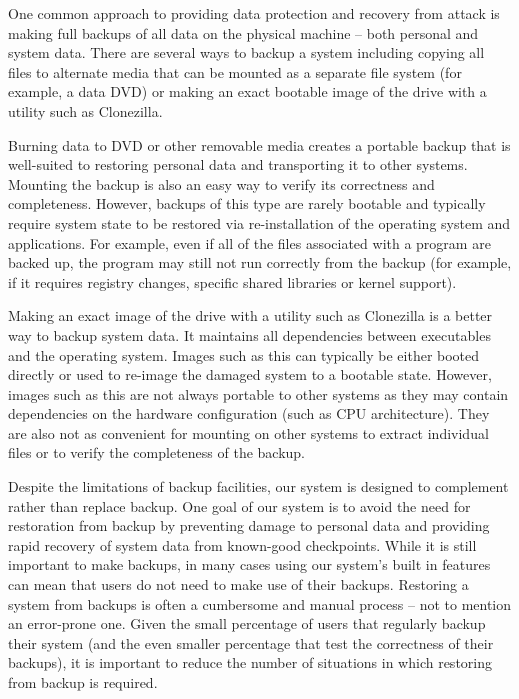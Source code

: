 One common approach to providing data protection and recovery from attack is making full backups of all data on the physical machine – both personal and system data. There are several ways to backup a system including copying all files to alternate media that can be mounted as a separate file system (for example, a data DVD) or making an exact bootable image of the drive with a utility such as Clonezilla\cite{clonezilla_website}.
 
Burning data to DVD or other removable media creates a portable backup that is well-suited to restoring personal data and transporting it to other systems. Mounting the backup is also an easy way to verify its correctness and completeness. However, backups of this type are rarely bootable and typically require system state to be restored via re-installation of the operating system and applications. For example, even if all of the files associated with a program are backed up, the program may still not run correctly from the backup (for example, if it requires registry changes, specific shared libraries or kernel support).
 
Making an exact image of the drive with a utility such as Clonezilla is a better way to backup system data. It maintains all dependencies between executables and the operating system. Images such as this can typically be either booted directly or used to re-image the damaged system to a bootable state. However, images such as this are not always portable to other systems as they may contain dependencies on the hardware configuration (such as CPU architecture). They are also not as convenient for mounting on other systems to extract individual files or to verify the completeness of the backup.
 
Despite the limitations of backup facilities, our system is designed to complement rather than replace backup. One goal of our system is to avoid the need for restoration from backup by preventing damage to personal data and providing rapid recovery of system data from known-good checkpoints. While it is still important to make backups, in many cases using our system's built in features can mean that users do not need to make use of their backups. Restoring a system from backups is often a cumbersome and manual process – not to mention an error-prone one. Given the small percentage of users that regularly backup their system (and the even smaller percentage that test the correctness of their backups), it is important to reduce the number of situations in which restoring from backup is required.
 
